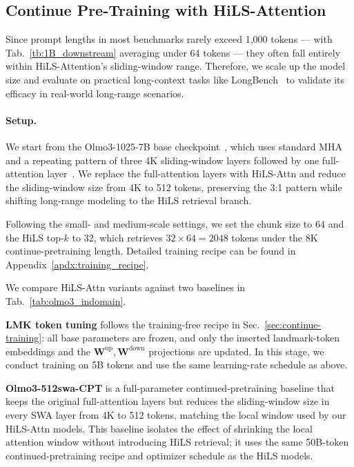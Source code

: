 \subsection{Continue Pre-Training with HiLS-Attention} 
Since prompt lengths in most benchmarks rarely exceed 1,000 tokens — with Tab.~\ref{tb:1B_downstream} averaging under 64 tokens — they often fall entirely within HiLS-Attention’s sliding-window range. Therefore, we scale up the model size and evaluate on practical long-context tasks like LongBench~\cite{bai2024longbench} to validate its efficacy in real-world long-range scenarios.
\paragraph{Setup.} 
We start from the Olmo3-1025-7B base checkpoint~\citep{allenai_olmo3_1025_7b_checkpoint}, which uses standard MHA and a repeating pattern of three 4K sliding-window layers followed by one full-attention layer~\citep{olmo2025olmo}. 
 We replace the full-attention layers with HiLS-Attn and reduce the sliding-window size from 4K to 512 tokens, preserving the 3:1 pattern while shifting long-range modeling to the HiLS retrieval branch.



Following the small- and medium-scale settings, we set the chunk size to 64 and the HiLS top-$k$ to 32, which retrieves $32 \times 64 = 2048$ tokens under the 8K continue-pretraining length. Detailed training recipe can be found in Appendix~\ref{apdx:training_recipe}.


We compare HiLS-Attn variants against two baselines in Tab.~\ref{tab:olmo3_indomain}.

\textbf{LMK token tuning} follows the training-free recipe in Sec.~\ref{sec:continue-training}: all base parameters are frozen, and only the inserted landmark-token embeddings and the $\mathbf{W}^{\mathrm{up}}, \mathbf{W}^{\mathrm{down}}$ projections are updated.
In this stage, we conduct training on 5B tokens and use the same learning-rate schedule as above.

\textbf{Olmo3-512swa-CPT} is a full-parameter continued-pretraining baseline that keeps the original full-attention layers but reduces the sliding-window size in every SWA layer from 4K to 512 tokens, matching the local window used by our HiLS-Attn models.
This baseline isolates the effect of shrinking the local attention window without introducing HiLS retrieval; it uses the same 50B-token continued-pretraining recipe and optimizer schedule as the HiLS models.

